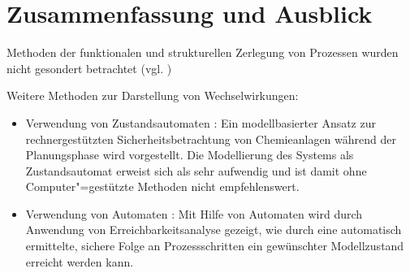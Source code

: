 \chapter{Zusammenfassung und Ausblick}\label{ch:zf}
Methoden der funktionalen und strukturellen Zerlegung von Prozessen wurden nicht gesondert betrachtet {(vgl. \cite[S. 9 ff.]{Venkatasubramanian_2003a})} 

Weitere Methoden zur Darstellung von Wechselwirkungen: 
\begin{itemize}
\item Verwendung von Zustandsautomaten \cite{Graf_2000,Graf_2000a}: Ein modellbasierter Ansatz zur rechnergest{\"u}tzten Sicherheitsbetrachtung von Chemieanlagen w{\"a}hrend der Planungsphase wird vorgestellt. Die Modellierung des Systems als Zustandsautomat erweist sich als sehr aufwendig und ist damit ohne Computer"=gest\"utzte Methoden nicht empfehlenswert. 
\item Verwendung von Automaten \cite{Cochard_2015}: Mit Hilfe von Automaten wird durch Anwendung von Erreichbarkeitsanalyse gezeigt, wie durch eine automatisch ermittelte, sichere Folge an Prozessschritten ein gew\"unschter Modellzustand erreicht werden kann.
\end{itemize}
